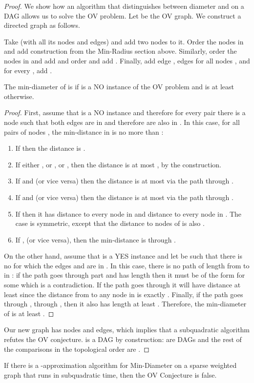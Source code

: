 \begin{proof}

We show how an algorithm that distinguishes between diameter  and  on a DAG allows us to solve the OV problem.
Let  be the OV graph.
We construct a directed graph  as follows.

Take  (with all its nodes and edges) and add two nodes  to it.
Order the nodes in  and add construction  from the Min-Radius section above.
Similarly, order the nodes in  and add  and order  and add .
Finally, add edge , edges  for all nodes , and for every , add .

\begin{claim}
The min-diameter of  is  if  is a NO instance of the OV problem and is at least  otherwise.
\end{claim}

\begin{proof}
First, assume that  is a NO instance and therefore for every pair  there is a node  such that both edges  are in  and therefore are also in .
In this case, for all pairs of nodes , the min-distance in  is no more than :
\begin{enumerate} 
\item If  then the distance is .
\item If either , or , or , then the distance is at most , by the  construction.
\item If  and  (or vice versa) then the distance is at most  via the path through .
\item If  and  (or vice versa) then the distance is at most  via the path through .
\item If  then it has distance  to every node in  and distance  to every node in . The  case is symmetric, except that the distance to nodes of  is also .
\item If ,  (or vice versa), then the min-distance is  through .
\end{enumerate}
On the other hand, assume that  is a YES instance and let  be such that there is no  for which the edges  and  are in . 
In this case, there is no path of length  from  to  in : if the path goes through part  and has length  then it must be of the form  for some  which is a contradiction. If the path goes through  it will have distance at least  since the distance from  to any node in  is exactly .
Finally, if the path goes through , through , then it also has length at least .
Therefore, the min-diameter of  is at least .
\end{proof}
Our new graph  has  nodes and  edges, which implies that a subquadratic algorithm refutes the OV conjecture. 
 is a DAG by construction:  are DAGs and the rest of the comparisons in the topological order are .
\end{proof}
\begin{lemma}
\label{lem:MinDiam}
If there is a -approximation algorithm for Min-Diameter on a sparse weighted graph that runs in subquadratic time, then the OV Conjecture is false.
\end{lemma}

